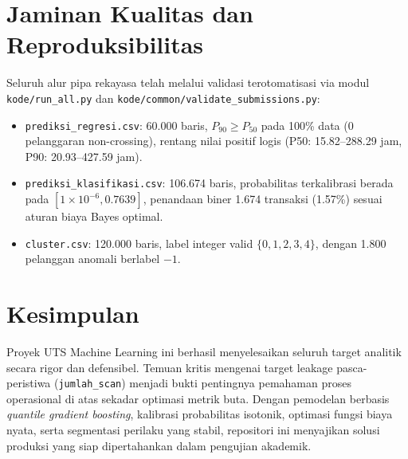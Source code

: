 \documentclass[11pt,a4paper]{article}
\begin{document}
\section{Jaminan Kualitas dan Reproduksibilitas}
Seluruh alur pipa rekayasa telah melalui validasi terotomatisasi via modul \texttt{kode/run\_all.py} dan \texttt{kode/common/validate\_submissions.py}:
\begin{itemize}
    \item \texttt{prediksi\_regresi.csv}: 60.000 baris, $P_{90} \ge P_{50}$ pada 100\% data (0 pelanggaran non-crossing), rentang nilai positif logis (P50: 15.82--288.29 jam, P90: 20.93--427.59 jam).
    \item \texttt{prediksi\_klasifikasi.csv}: 106.674 baris, probabilitas terkalibrasi berada pada $[1\times 10^{-6}, 0.7639]$, penandaan biner 1.674 transaksi (1.57\%) sesuai aturan biaya Bayes optimal.
    \item \texttt{cluster.csv}: 120.000 baris, label integer valid $\{0, 1, 2, 3, 4\}$, dengan 1.800 pelanggan anomali berlabel $-1$.
\end{itemize}

\section{Kesimpulan}
Proyek UTS Machine Learning ini berhasil menyelesaikan seluruh target analitik secara rigor dan defensibel. Temuan kritis mengenai target leakage pasca-peristiwa (\texttt{jumlah\_scan}) menjadi bukti pentingnya pemahaman proses operasional di atas sekadar optimasi metrik buta. Dengan pemodelan berbasis \textit{quantile gradient boosting}, kalibrasi probabilitas isotonik, optimasi fungsi biaya nyata, serta segmentasi perilaku yang stabil, repositori ini menyajikan solusi produksi yang siap dipertahankan dalam pengujian akademik.
\end{document}
